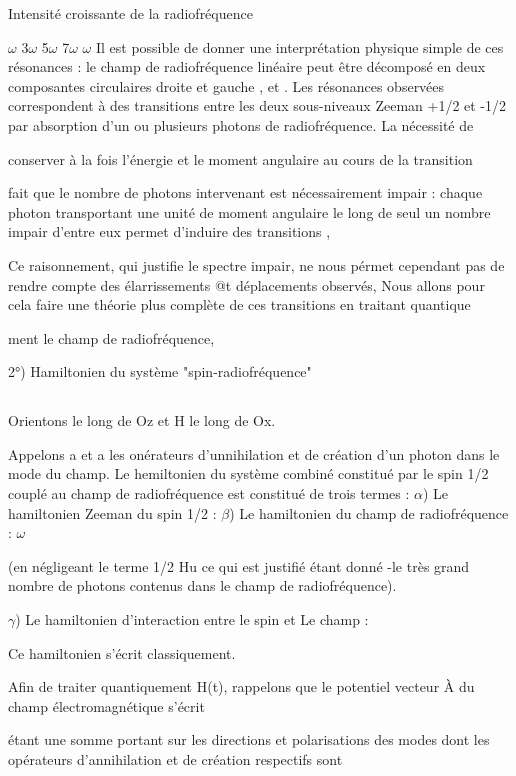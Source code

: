 Intensité croissante
de la radiofréquence

 $\omega$ 3$\omega$ 5$\omega$ 7$\omega$ $\omega$
Il est possible de donner une interprétation physique simple de ces
résonances : le champ de radiofréquence linéaire peut être décomposé en deux
composantes circulaires droite et gauche , et . Les résonances observées correspondent à des transitions entre les deux sous-niveaux Zeeman +1/2 et -1/2
par absorption d'un ou plusieurs photons de radiofréquence. La nécessité de

conserver à la fois l'énergie et le moment angulaire au cours de la transition

fait que le nombre de photons intervenant est nécessairement impair : chaque
photon transportant une unité de moment angulaire le long de seul un
nombre impair d'entre eux permet d'induire des transitions ,

Ce raisonnement, qui justifie le spectre impair, ne nous pérmet cependant pas
de rendre compte des élarrissements @t déplacements observés, Nous allons pour
cela faire une théorie plus complète de ces transitions en traitant quantique

ment le champ de radiofréquence,

2°) Hamiltonien du système "spin-radiofréquence"

\subsection{}%

Orientons  le long de Oz et H le long de Ox.

Appelons a et a les onérateurs d'unnihilation et de création d'un
photon dans le mode du champ. Le hemiltonien du système combiné constitué par
le spin 1/2 couplé au champ de radiofréquence est constitué de trois termes :
$\alpha$) Le hamiltonien Zeeman du spin 1/2 :
$\beta$) Le hamiltonien du champ de radiofréquence : $\omega$

(en négligeant le terme 1/2 Hu ce qui est justifié étant donné -le très grand
nombre de photons contenus dans le champ de radiofréquence).

$\gamma$) Le hamiltonien d'interaction entre le spin et Le champ : 

Ce hamiltonien s'écrit classiquement.


Afin de traiter quantiquement H(t), rappelons que le potentiel
vecteur À du champ électromagnétique s'écrit

étant une somme portant sur les directions et polarisations des modes
dont les opérateurs d'annihilation et de création respectifs sont

